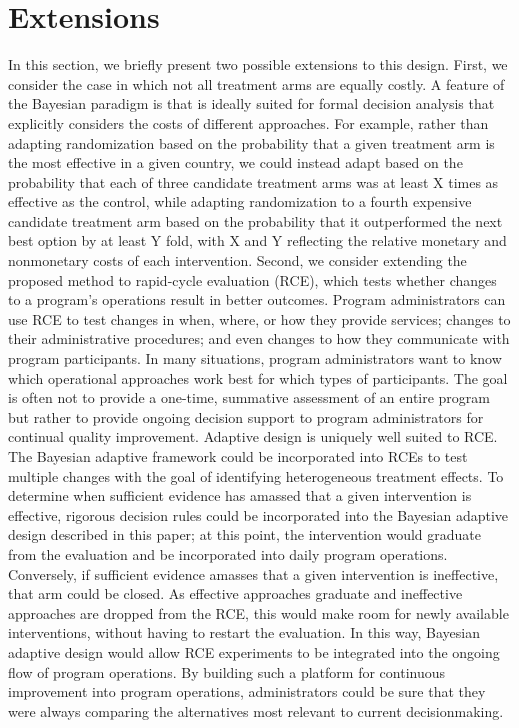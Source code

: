 \documentclass{acm_proc_article-sp}
\begin{document}
\section{Extensions}
In this section, we briefly present two possible extensions to this design. First, we consider the case in which not all treatment arms are equally costly. A feature of the Bayesian paradigm is that is ideally suited for formal decision analysis that explicitly considers the costs of different approaches. For example, rather than adapting randomization based on the probability that a given treatment arm is the most effective in a given country, we could instead adapt based on the probability that each of three candidate treatment arms was at least X times as effective as the control, while adapting randomization to a fourth expensive candidate treatment arm based on the probability that it outperformed the next best option by at least Y fold, with X and Y reflecting the relative monetary and nonmonetary costs of each intervention.
Second, we consider extending the proposed method to rapid-cycle evaluation (RCE), which tests whether changes to a program’s operations result in better outcomes. Program administrators can use RCE to test changes in when, where, or how they provide services; changes to their administrative procedures; and even changes to how they communicate with program participants. In many situations, program administrators want to know which operational approaches work best for which types of participants. The goal is often not to provide a one-time, summative assessment of an entire program but rather to provide ongoing decision support to program administrators for continual quality improvement.
Adaptive design is uniquely well suited to RCE. The Bayesian adaptive framework could be incorporated into RCEs to test multiple changes with the goal of identifying heterogeneous treatment effects. To determine when sufficient evidence has amassed that a given intervention is effective, rigorous decision rules could be incorporated into the Bayesian adaptive design described in this paper; at this point, the intervention would graduate from the evaluation and be incorporated into daily program operations. Conversely, if sufficient evidence amasses that a given intervention is ineffective, that arm could be closed. As effective approaches graduate and ineffective approaches are dropped from the RCE, this would make room for newly available interventions, without having to restart the evaluation. In this way, Bayesian adaptive design would allow RCE experiments to be integrated into the ongoing flow of program operations. By building such a platform for continuous improvement into program operations, administrators could be sure that they were always comparing the alternatives most relevant to current decisionmaking.
\end{document}
